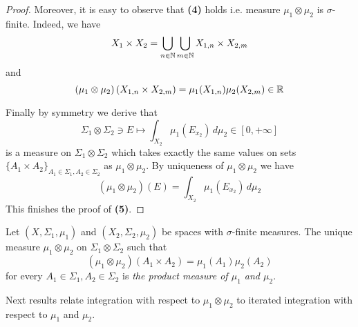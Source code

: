 \begin{proof}
    Moreover, it is easy to observe that \textbf{(4)} holds i.e. measure $\mu_1\otimes \mu_2$ is $\sigma$-finite. Indeed, we have
    $$X_1\times X_2 = \bigcup_{n\in {\mathbb N}}\bigcup_{m\in {\mathbb N}}X_{1,n}\times X_{2,m}$$
    and
    $$\left(\mu_1\otimes \mu_2\right)\left(X_{1,n}\times X_{2,m}\right) = \mu_1(X_{1,n})\mu_2(X_{2,m}) \in {\mathbb R}$$
    
    Finally by symmetry we derive that
    $$\Sigma_1\otimes \Sigma_2\ni E \mapsto \int_{X_2}\mu_1(E_{x_2})\,d\mu_2\in [0,+\infty]$$
    is a measure on $\Sigma_1\otimes \Sigma_2$ which takes exactly the same values on sets $\big\{A_1\times A_2\big\}_{A_1\in \Sigma_1,A_2\in \Sigma_2}$ as $\mu_1\otimes \mu_2$. By uniqueness of $\mu_1\otimes \mu_2$ we have
    $$(\mu_1\otimes \mu_2)(E) = \int_{X_2}\mu_1(E_{x_2})\,d\mu_2$$
    This finishes the proof of \textbf{(5)}.
\end{proof}

\begin{definition}
    Let $(X,\Sigma_1,\mu_1)$ and $(X_2,\Sigma_2,\mu_2)$ be spaces with $\sigma$-finite measures. The unique measure $\mu_1\otimes \mu_2$ on $\Sigma_1\otimes \Sigma_2$ such that
    $$\left(\mu_1\otimes \mu_2\right)\left(A_1\times A_2\right) = \mu_1(A_1)\mu_2(A_2)$$
    for every $A_1\in \Sigma_1, A_2\in \Sigma_2$ is \textit{the product measure of $\mu_1$ and $\mu_2$}.
\end{definition}
\noindent
Next results relate integration with respect to $\mu_1\otimes \mu_2$ to iterated integration with respect to $\mu_1$ and $\mu_2$.

